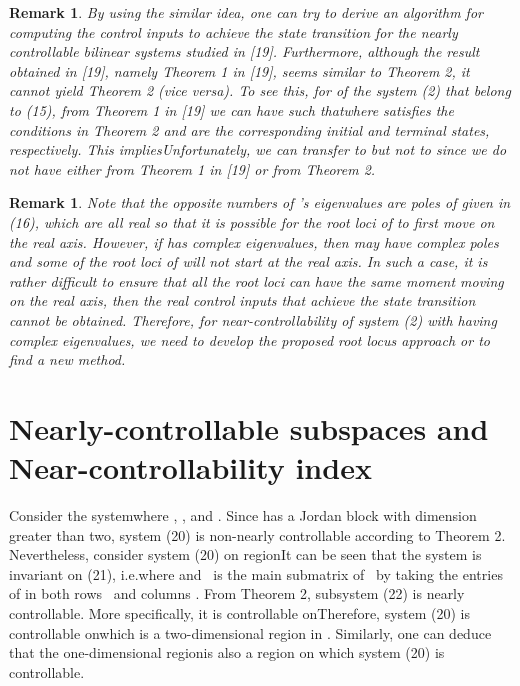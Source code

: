 \documentclass[journal,a4paper,12pt,onecolumn]{IEEEtran}
\newtheorem{remark}[theorem]{Remark}
\begin{document}
\begin{remark}
By using the similar idea, one can try to derive an algorithm for computing
the control inputs to achieve the state transition for the nearly
controllable bilinear systems studied in [19]. Furthermore, although the
result obtained in [19], namely Theorem 1 in [19], seems similar to Theorem
2, it cannot yield Theorem 2 (vice versa). To see this, for  of
the system (2) that belong to (15), from Theorem 1 in [19] we can have  such thatwhere  satisfies the conditions in Theorem 2 and   are the corresponding initial and terminal states,
respectively. This impliesUnfortunately, we can transfer  to  but not to  since we do not have  either from Theorem 1 in [19] or
from Theorem 2.
\end{remark}



\begin{remark}
Note that the opposite numbers of 's eigenvalues are poles of  given in (16), which are all real so that it is possible for the
root loci of  to first move on the real axis.
However, if  has complex eigenvalues, then  may have
complex poles and some of the root loci of  will not
start at the real axis. In such a case, it is rather difficult to ensure
that all the root loci can have the same moment moving on the real axis,
then the real control inputs that achieve the state transition cannot be
obtained. Therefore, for near-controllability of system (2) with  having
complex eigenvalues, we need to develop the proposed root locus approach or
to find a new method.
\end{remark}



\section{Nearly-controllable subspaces and Near-controllability index}

Consider the systemwhere , , and . Since  has a Jordan block with dimension greater
than two, system (20) is non-nearly controllable according to Theorem 2.
Nevertheless, consider system (20) on regionIt can be seen that the system is invariant on (21), i.e.where  and \ is the main submatrix of \ by taking the
entries of  in both rows \ and columns . From Theorem 2,
subsystem (22) is nearly controllable. More specifically, it is controllable
onTherefore, system (20) is controllable onwhich is a two-dimensional region in . Similarly, one can deduce that the one-dimensional regionis also a region on which system (20) is controllable.
\end{document}
